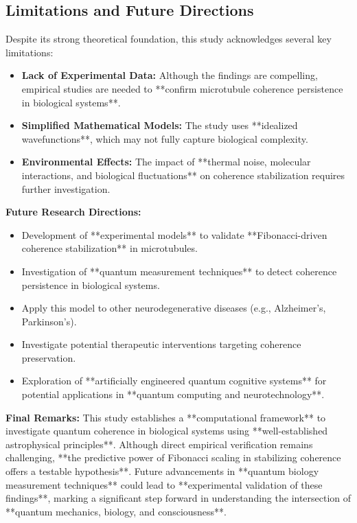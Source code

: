 \subsection{Limitations and Future Directions}
Despite its strong theoretical foundation, this study acknowledges several key limitations:
\begin{itemize}
    \item \textbf{Lack of Experimental Data:} Although the findings are compelling, empirical studies are needed to **confirm microtubule coherence persistence in biological systems**.
    \item \textbf{Simplified Mathematical Models:} The study uses **idealized wavefunctions**, which may not fully capture biological complexity.
    \item \textbf{Environmental Effects:} The impact of **thermal noise, molecular interactions, and biological fluctuations** on coherence stabilization requires further investigation.
\end{itemize}
\textbf{Future Research Directions:}
\begin{itemize}
    \item Development of **experimental models** to validate **Fibonacci-driven coherence stabilization** in microtubules.
    \item Investigation of **quantum measurement techniques** to detect coherence persistence in biological systems.
    \item Apply this model to other neurodegenerative diseases (e.g., Alzheimer’s, Parkinson’s).
    \item Investigate potential therapeutic interventions targeting coherence preservation.
    \item Exploration of **artificially engineered quantum cognitive systems** for potential applications in **quantum computing and neurotechnology**.
\end{itemize}
\textbf{Final Remarks:}  
This study establishes a **computational framework** to investigate quantum coherence in biological systems using **well-established astrophysical principles**. Although direct empirical verification remains challenging, **the predictive power of Fibonacci scaling in stabilizing coherence offers a testable hypothesis**. Future advancements in **quantum biology measurement techniques** could lead to **experimental validation of these findings**, marking a significant step forward in understanding the intersection of **quantum mechanics, biology, and consciousness**.





